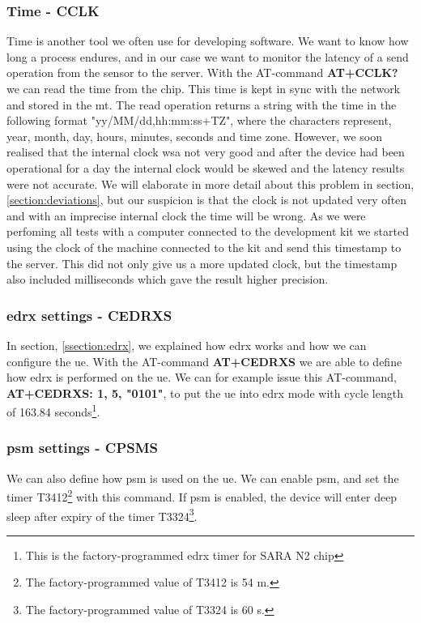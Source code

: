 \documentclass[USenglish]{ifimaster}  %
\begin{document}
\subsubsection{Time - CCLK}
Time is another tool we often use for developing software. We want to know how long a process endures, and in our case we want to monitor the latency of a send operation from the sensor to the server. With the AT-command \textbf{AT+CCLK?} we can read the time from the chip. This time is kept in sync with the network and stored in the \acrshort{mt}. The read operation returns a string with the time in the following format "yy/MM/dd,hh:mm:ss+TZ", where the characters represent, year, month, day, hours, minutes, seconds and time zone. However, we soon realised that the internal clock wsa not very good and after the device had been operational for a day the internal clock would be skewed and the latency results were not accurate. We will elaborate in more detail about this problem in section, \vref{section:deviations}, but our suspicion is that the clock is not updated very often and with an imprecise internal clock the time will be wrong. As we were perfoming all tests with a computer connected to the development kit we started using the clock of the machine connected to the kit and send this timestamp to the server. This did not only give us a more updated clock, but the timestamp also included milliseconds which gave the result higher precision.

\subsubsection{\acrshort{edrx} settings - CEDRXS}
In section, \vref{ssection:edrx}, we explained how \acrshort{edrx} works and how we can configure the \acrshort{ue}. With the AT-command \textbf{AT+CEDRXS} we are able to define how \acrshort{edrx} is performed on the \acrshort{ue}. We can for example issue this AT-command, \textbf{AT+CEDRXS: 1, 5, "0101"}, to put the \acrshort{ue} into \acrshort{edrx} mode with cycle length of 163.84 seconds\footnote{This is the factory-programmed \acrshort{edrx} timer for SARA N2 chip}.

\subsubsection{\acrshort{psm} settings - CPSMS}
We can also define how \acrshort{psm} is used on the \acrshort{ue}. We can enable \acrshort{psm}, and set the timer \acrfull{T3412}\footnote{The factory-programmed value of \acrshort{T3412} is 54 m.\cite{atcommand:ubloxchip}} with this command. If \acrshort{psm} is enabled, the device will enter deep sleep after expiry of the timer \acrfull{T3324}\footnote{The factory-programmed value of \acrshort{T3324} is 60 s.\cite{atcommand:ubloxchip}}.
\end{document}
